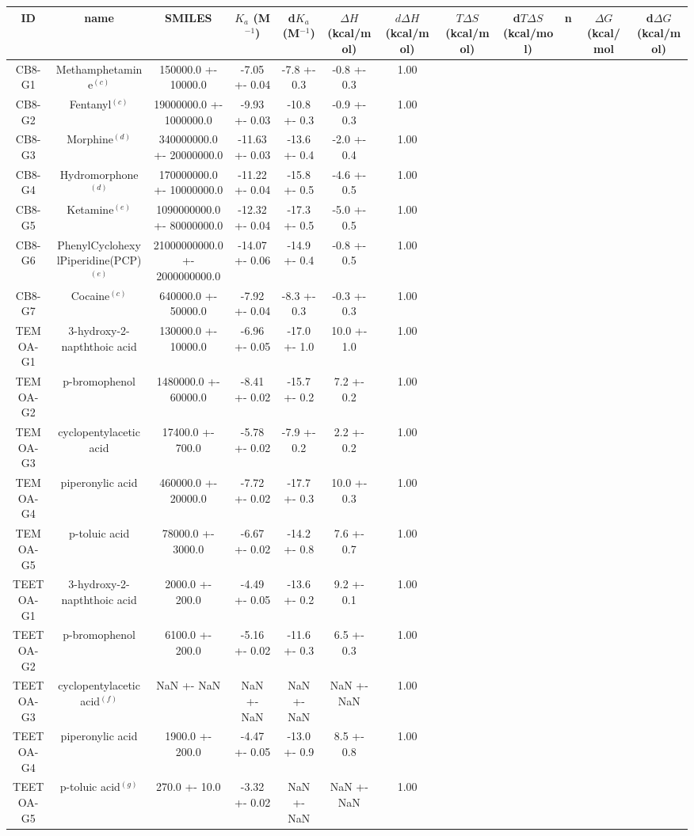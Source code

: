 \documentclass{article}
\begin{document}
\begin{center}
\footnotesize
\begin{tabu}{| c | c | c | c | c | c | c | c | c | c | c | c |}
\hline
\rowfont{\bfseries} ID & name & SMILES & $K_a$ (M$^{-1}$) & d$K_a$ (M$^{-1}$) & $\Delta H$ (kcal/mol) & $d\Delta H$ (kcal/mol) & $T\Delta S$ (kcal/mol) & d$T\Delta S$ (kcal/mol) & n & $\Delta G$ (kcal/mol & d$\Delta G$ (kcal/mol) \\
\hline
\hline
CB8-G1 & Methamphetamine$^{(c)}$ & 150000.0 +- 10000.0 & -7.05 +- 0.04 & -7.8 +- 0.3 & -0.8 +- 0.3 &  1.00 \\
\hline
CB8-G2 & Fentanyl$^{(c)}$ & 19000000.0 +- 1000000.0 & -9.93 +- 0.03 & -10.8 +- 0.3 & -0.9 +- 0.3 &  1.00 \\
\hline
CB8-G3 & Morphine$^{(d)}$ & 340000000.0 +- 20000000.0 & -11.63 +- 0.03 & -13.6 +- 0.4 & -2.0 +- 0.4 &  1.00 \\
\hline
CB8-G4 & Hydromorphone$^{(d)}$ & 170000000.0 +- 10000000.0 & -11.22 +- 0.04 & -15.8 +- 0.5 & -4.6 +- 0.5 &  1.00 \\
\hline
CB8-G5 & Ketamine$^{(e)}$ & 1090000000.0 +- 80000000.0 & -12.32 +- 0.04 & -17.3 +- 0.5 & -5.0 +- 0.5 &  1.00 \\
\hline
CB8-G6 & PhenylCyclohexylPiperidine(PCP)$^{(e)}$ & 21000000000.0 +- 2000000000.0 & -14.07 +- 0.06 & -14.9 +- 0.4 & -0.8 +- 0.5 &  1.00 \\
\hline
CB8-G7 & Cocaine$^{(c)}$ & 640000.0 +- 50000.0 & -7.92 +- 0.04 & -8.3 +- 0.3 & -0.3 +- 0.3 &  1.00 \\
\hline
\hline
TEMOA-G1 & 3-hydroxy-2-napththoic acid & 130000.0 +- 10000.0 & -6.96 +- 0.05 & -17.0 +- 1.0 & 10.0 +- 1.0 &  1.00 \\
\hline
TEMOA-G2 & p-bromophenol & 1480000.0 +- 60000.0 & -8.41 +- 0.02 & -15.7 +- 0.2 & 7.2 +- 0.2 &  1.00 \\
\hline
TEMOA-G3 & cyclopentylacetic acid & 17400.0 +- 700.0 & -5.78 +- 0.02 & -7.9 +- 0.2 & 2.2 +- 0.2 &  1.00 \\
\hline
TEMOA-G4 & piperonylic acid & 460000.0 +- 20000.0 & -7.72 +- 0.02 & -17.7 +- 0.3 & 10.0 +- 0.3 &  1.00 \\
\hline
TEMOA-G5 & p-toluic acid & 78000.0 +- 3000.0 & -6.67 +- 0.02 & -14.2 +- 0.8 & 7.6 +- 0.7 &  1.00 \\
\hline
\hline
TEETOA-G1 & 3-hydroxy-2-napththoic acid & 2000.0 +- 200.0 & -4.49 +- 0.05 & -13.6 +- 0.2 & 9.2 +- 0.1 &  1.00 \\
\hline
TEETOA-G2 & p-bromophenol & 6100.0 +- 200.0 & -5.16 +- 0.02 & -11.6 +- 0.3 & 6.5 +- 0.3 &  1.00 \\
\hline
TEETOA-G3 & cyclopentylacetic acid$^{(f)}$ & NaN +- NaN & NaN +- NaN & NaN +- NaN & NaN +- NaN &  1.00 \\
\hline
TEETOA-G4 & piperonylic acid & 1900.0 +- 200.0 & -4.47 +- 0.05 & -13.0 +- 0.9 & 8.5 +- 0.8 &  1.00 \\
\hline
TEETOA-G5 & p-toluic acid$^{(g)}$ & 270.0 +- 10.0 & -3.32 +- 0.02 & NaN +- NaN & NaN +- NaN &  1.00 \\
\hline
\end{tabu}\end{center}\vspace{5mm}
\end{document}
